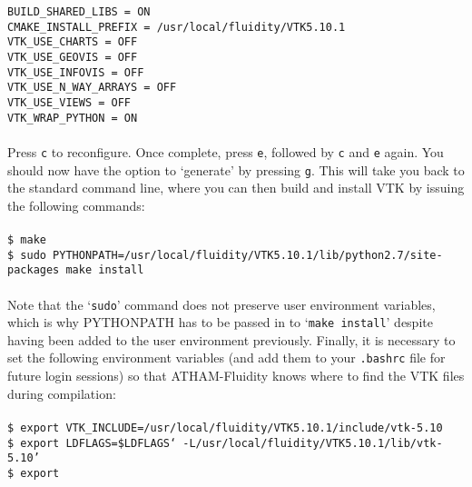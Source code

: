\documentclass[10pt,a4paper]{article}
\newcommand\tab[1][0.5cm]{\hspace*{#1}}
\begin{document}
\tab \texttt{BUILD\_SHARED\_LIBS = ON}\\
\tab \texttt{CMAKE\_INSTALL\_PREFIX = /usr/local/fluidity/VTK5.10.1}\\
\tab \texttt{VTK\_USE\_CHARTS = OFF}\\
\tab \texttt{VTK\_USE\_GEOVIS = OFF}\\
\tab \texttt{VTK\_USE\_INFOVIS = OFF}\\
\tab \texttt{VTK\_USE\_N\_WAY\_ARRAYS = OFF}\\
\tab \texttt{VTK\_USE\_VIEWS = OFF}\\
\tab \texttt{VTK\_WRAP\_PYTHON = ON}\\\\
Press \texttt{c} to reconfigure. Once complete, press \texttt{e}, followed by \texttt{c} and \texttt{e} again. You should now have the option to `generate' by pressing \texttt{g}. This will take you back to the standard command line, where you can then build and install VTK by issuing the following commands:\\\\
\tab \texttt{\$ make}\\
\tab \texttt{\$ sudo PYTHONPATH=/usr/local/fluidity/VTK5.10.1/lib/python2.7/site-packages make install}\\\\
Note that the `\texttt{sudo}' command does not preserve user environment variables, which is why PYTHONPATH has to be passed in to `\texttt{make install}' despite having been added to the user environment previously. Finally, it is necessary to set the following environment variables (and add them to your \texttt{.bashrc} file for future login sessions) so that ATHAM-Fluidity knows where to find the VTK files during compilation:\\\\
\tab \texttt{\$ export VTK\_INCLUDE=/usr/local/fluidity/VTK5.10.1/include/vtk-5.10}\\
\tab \texttt{\$ export LDFLAGS=\$LDFLAGS` -L/usr/local/fluidity/VTK5.10.1/lib/vtk-5.10'}\\
\tab \texttt{\$ export }
\end{document}

